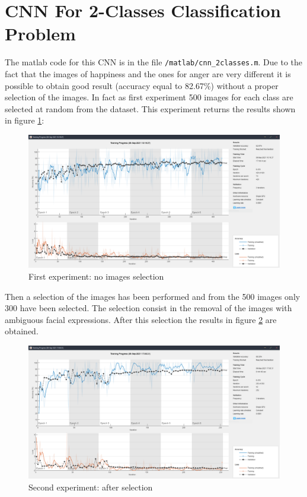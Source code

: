\documentclass[a4paper]{report}
\begin{document}
	\section{CNN For 2-Classes Classification Problem}
	\noindent The matlab code for this CNN is in the file \texttt{/matlab/cnn\_2classes.m}. Due to the fact that the images of happiness and the ones for anger are very different it is possible to obtain good result (accuracy equal to 82.67\%) without a proper selection of the images.
	\noindent In fact as first experiment 500 images for each class are selected at random from the dataset. This experiment returns the results shown in figure \ref{img: trainingCnnTwoClasses}:
	
	\begin{figure}[htbp]
		\centering
		\includegraphics[scale=0.31]{img/trainingCnnTwoClasses.png}
		\caption{First experiment: no images selection}
		\label{img: trainingCnnTwoClasses}
	\end{figure}

	\noindent Then a selection of the images has been performed and from the 500 images only 300 have been selected. The selection consist in the removal of the images with ambiguous facial expressions. After this selection the results in figure \ref{img: trainingCnnTwoClassesAfterSelection} are obtained.
	
	\begin{figure}[htbp]
		\centering
		\includegraphics[scale=0.31]{img/trainingCnnTwoClasses_afterSelection.png}
		\caption{Second experiment: after selection}
		\label{img: trainingCnnTwoClassesAfterSelection}
	\end{figure}
\end{document}
